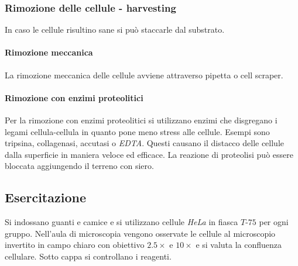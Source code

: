 		\subsubsection{Rimozione delle cellule - harvesting}
		In caso le cellule risultino sane si pu\`o staccarle dal substrato. 
			
			\paragraph{Rimozione meccanica}
			La rimozione meccanica delle cellule avviene attraverso pipetta o cell scraper.

			\paragraph{Rimozione con enzimi proteolitici}
			Per la rimozione con enzimi proteolitici si utilizzano enzimi che disgregano i legami cellula-cellula in quanto pone meno stress alle cellule.
			Esempi sono tripsina, collagenasi, accutasi o \emph{EDTA}.
			Questi causano il distacco delle cellule dalla superficie in maniera veloce ed efficace.
			La reazione di proteolisi pu\`o essere bloccata aggiungendo il terreno con siero.

	\subsection{Esercitazione}
	Si indossano guanti e camice e si utilizzano cellule \emph{HeLa} in fiasca $T$-$75$ per ogni gruppo.
	Nell'aula di microscopia vengono osservate le cellule al microscopio invertito in campo chiaro con obiettivo $2.5\times$ e $10\times$ e si valuta la confluenza cellulare.
	Sotto cappa si controllano i reagenti. 
		

